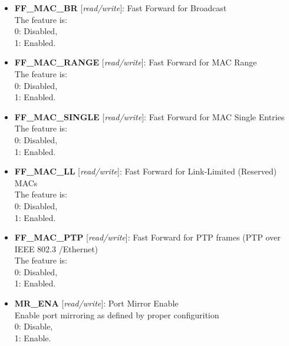 \begin{itemize}
\item \begin{small}
{\bf 
FF\_MAC\_BR
} [\emph{read/write}]: Fast Forward for Broadcast
\\
The feature is:\\                 0: Disabled,\\                 1: Enabled.
\end{small}
\item \begin{small}
{\bf 
FF\_MAC\_RANGE
} [\emph{read/write}]: Fast Forward for MAC Range
\\
The feature is:\\                 0: Disabled,\\                 1: Enabled.
\end{small}
\item \begin{small}
{\bf 
FF\_MAC\_SINGLE
} [\emph{read/write}]: Fast Forward for MAC Single Entries
\\
The feature is:\\                 0: Disabled,\\                 1: Enabled.
\end{small}
\item \begin{small}
{\bf 
FF\_MAC\_LL
} [\emph{read/write}]: Fast Forward for Link-Limited (Reserved) MACs
\\
The feature is:\\                 0: Disabled,\\                 1: Enabled.
\end{small}
\item \begin{small}
{\bf 
FF\_MAC\_PTP
} [\emph{read/write}]: Fast Forward for PTP frames (PTP over IEEE 802.3 /Ethernet)
\\
The feature is:\\                 0: Disabled,\\                 1: Enabled.
\end{small}
\item \begin{small}
{\bf 
MR\_ENA
} [\emph{read/write}]: Port Mirror Enable
\\
Enable port mirroring as defined by proper configurition\\                 0: Disable,\\                 1: Enable.

\end{small}
\end{itemize}
